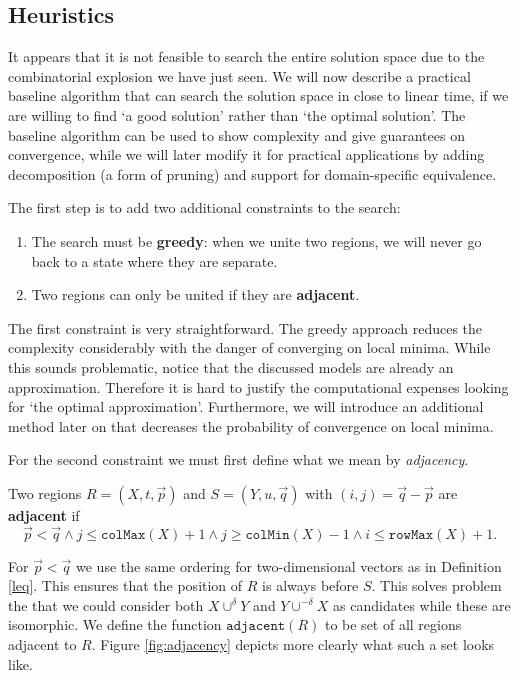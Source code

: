 \documentclass{llncs}
\begin{document}
\subsection{Heuristics}

It appears that it is not feasible to search the entire solution space due to the combinatorial explosion we have just seen. We will now describe a practical baseline algorithm that can search the solution space in close to linear time, if we are willing to find `a good solution' rather than `the optimal solution'. The baseline algorithm can be used to show complexity and give guarantees on convergence, while we will later modify it for practical applications by adding decomposition (a form of pruning) and support for domain-specific equivalence.

The first step is to add two additional constraints to the search:
\begin{enumerate}
\item The search must be \textbf{greedy}: when we unite two regions, we will never go back to a state where they are separate.
\item Two regions can only be united if they are \textbf{adjacent}.
\end{enumerate}

The first constraint is very straightforward. The greedy approach reduces the complexity considerably with the danger of converging on local minima. While this sounds problematic, notice that the discussed models are already an approximation. Therefore it is hard to justify the computational expenses looking for `the optimal approximation'. Furthermore, we will introduce an additional method later on that decreases the probability of convergence on local minima.

For the second constraint we must first define what we mean by \emph{adjacency}.
\begin{definition}
Two regions $R=(X,t,\vec{p})$ and $S=(Y,u,\vec{q})$ with $(i,j)=\vec{q}-\vec{p}$ are \textbf{adjacent} if
$$
	\vec{p} < \vec{q} \land j \leq \mathtt{colMax}(X)+1 \land j \geq \mathtt{colMin}(X)-1 \land i \leq \mathtt{rowMax}(X)+1.
$$
\end{definition}

For $\vec{p} < \vec{q}$  we use the same ordering for two-dimensional vectors as in Definition \ref{leq}. This ensures that the position of $R$ is always before $S$. This solves problem the that we could consider both $X \cup^{\delta} Y$ and $Y \cup^{-\delta} X$ as candidates while these are isomorphic. We define the function $\mathtt{adjacent}(R)$ to be set of all regions adjacent to $R$. Figure \ref{fig:adjacency} depicts more clearly what such a set looks like.
\end{document}
